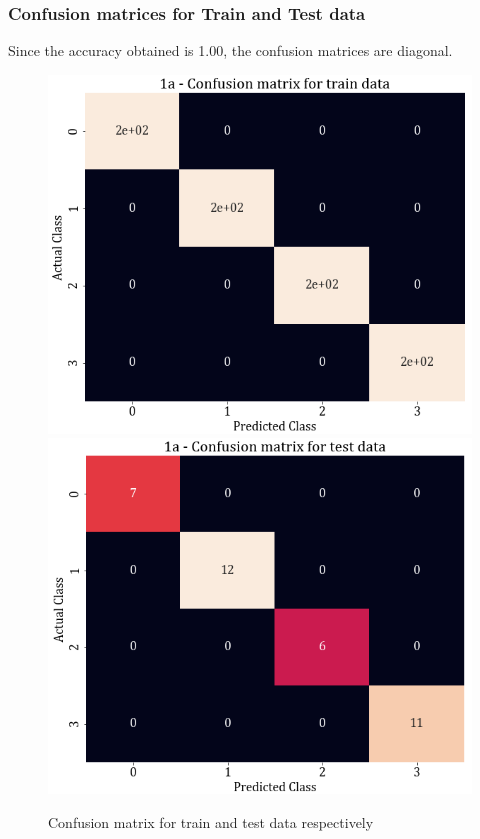 \documentclass[11pt,a4paper]{article}
\begin{document}
\subsubsection{Confusion matrices for Train and Test data}
Since the accuracy obtained is 1.00, the confusion matrices are diagonal. 
\begin{figure}[H]
\centering
    \includegraphics[scale=0.4]{images/1A_confmatrix_train.png}
    \includegraphics[scale=0.4]{images/1A_confmatrix_test.png}
    \caption{Confusion matrix for train and test data respectively}
\end{figure}
\end{document}
